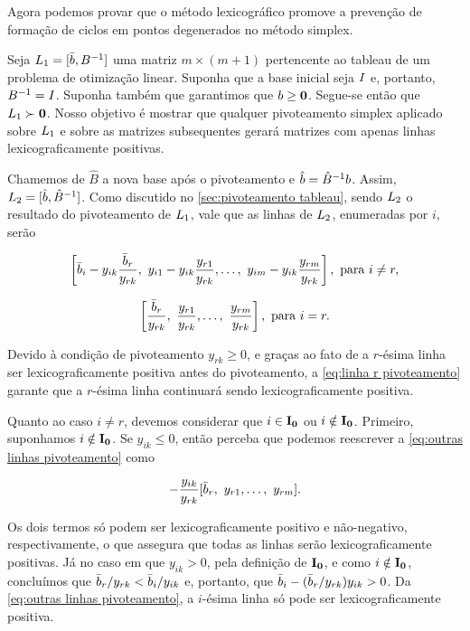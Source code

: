 Agora podemos provar que o método lexicográfico promove a prevenção de formação de ciclos em pontos degenerados no método simplex.

Seja $L_{1} = [\bar{b}, B^{-1}]$ uma matriz $m\times(m+1)$ pertencente ao tableau de um problema de otimização linear. Suponha que a base inicial seja $\vb  \vb I$ e, portanto, $B^{-1} = \vb  \vb I$. Suponha também que garantimos que $b \geq \vb 0$. Segue-se então que $L_{1} \succ \vb 0$. Nosso objetivo é mostrar que qualquer pivoteamento simplex aplicado sobre $L_{1}$ e sobre as matrizes subsequentes gerará matrizes com apenas linhas lexicograficamente positivas.

Chamemos de $\hat{ B}$ a nova base após o pivoteamento e $\hat{b} = \hat{B}^{-1}b$. Assim, $L_{2} = [\hat{b}, \hat{B}^{-1}]$. Como discutido no \cref{sec:pivoteamento tableau}, sendo $L_{2}$ o resultado do pivoteamento de $L_{1}$, vale que as linhas de $L_{2}$, enumeradas por $i$, serão

\begin{equation}\label{eq:outras linhas pivoteamento}
    \left[\bar{b}_{i}- y_{ik}\frac{\bar{b}_{r}}{ y_{rk}},\  y_{i1} -  y_{ik}\frac{ y_{r1}}{ y_{rk}}, \ldots,\  y_{im} -  y_{ik}\frac{ y_{rm}}{ y_{rk}}\right],\ \text{para } i \neq r,
\end{equation}

\begin{equation}\label{eq:linha r pivoteamento}
    \left[\frac{\bbar{r}}{ y_{rk}},\ \frac{ y_{r1}}{ y_{rk}}, \ldots,\ \frac{ y_{rm}}{ y_{rk}} \right],\ \text{para } i = r.
\end{equation}

Devido à condição de pivoteamento $ y_{rk} \geq 0$, e graças ao fato de a $r$-ésima linha ser lexicograficamente positiva antes do pivoteamento, a \cref{eq:linha r pivoteamento} garante que a $r$-ésima linha continuará sendo lexicograficamente positiva.

Quanto ao caso $i \neq r$, devemos considerar que $i \in  \vb{I_0}$ ou $i \notin  \vb{I_0}$. Primeiro, suponhamos $i \notin  \vb{I_0}$. Se $ y_{ik} \leq 0$, então perceba que podemos reescrever a \cref{eq:outras linhas pivoteamento} como

\begin{equation}
    [\bbar{i},\  y_{i1}, \ldots,\  y_{im}] - \frac{ y_{ik}}{ y_{rk}}[\bbar{r},\  y_{r1}, \ldots,\  y_{rm}].
\end{equation}

Os dois termos só podem ser lexicograficamente positivo e não-negativo, respectivamente, o que assegura que todas as linhas serão lexicograficamente positivas. Já no caso em que $ y_{ik} > 0$, pela definição de $ \vb{I_0}$, e como $i \notin  \vb{I_0}$, concluímos que $\bar{b}_{r}/ y_{rk} < \bar{b}_{i}/ y_{ik}$ e, portanto, que $\bar{b}_{i} - (\bar{b}_{r}/ y_{rk}) y_{ik} > 0$. Da \cref{eq:outras linhas pivoteamento}, a $i$-ésima linha só pode ser lexicograficamente positiva.

